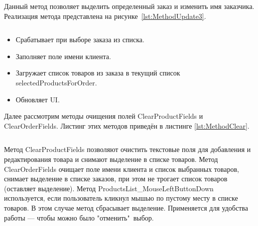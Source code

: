 \documentclass[12pt]{article}
\newcommand{\colorGIT}[1]{\textcolor{CtpLavender}{#1}}
\renewcommand{\texttt}[1]{{\small\ttfamily #1}}
\newenvironment{code}
  {\par\captionsetup{type=listing}\noindent}
  {\par\vspace{\baselineskip}}
\numberwithin{listing}{section}
\numberwithin{figure}{section}
\begin{document}
Данный метод позволяет выделить определенный заказ и изменить имя заказчика. Реализация метода представлена на рисунке~\ref{lst:MethodUpdate3}.

\begin{code}
	\inputminted[firstline=379, lastline=390]{csharp}{../3lab/StoreManager/MainWindow.xaml.cs}
	\caption{\colorGIT{\href{https://github.com/WebMasterIT/Csharp_Labs/blob/ec375afd16c0647b337cf3d8a79c8bef904fc1be/3lab/StoreManager/MainWindow.xaml.cs\#L379-L390}{Метод}} обновления нового товара }
	\label{lst:MethodUpdate3}
\end{code}

\begin{itemize}
	\item Срабатывает при выборе заказа из списка.
	\item Заполняет поле имени клиента.
	\item Загружает список товаров из заказа в текущий список \texttt{selectedProductsForOrder}.
	\item Обновляет \texttt{UI}.
\end{itemize}

{}


Далее рассмотрим методы очищения полей \texttt{ClearProductFields} и \texttt{ClearOrderFields}. Листинг этих методов приведён в листинге \ref{lst:MethodClear}.

\begin{code}
	\inputminted[firstline=392, lastline=432]{csharp}{../3lab/StoreManager/MainWindow.xaml.cs}
	\caption{\colorGIT{\href{https://github.com/WebMasterIT/Csharp_Labs/blob/ec375afd16c0647b337cf3d8a79c8bef904fc1be/3lab/StoreManager/MainWindow.xaml.cs\#L392-L432}{Методы}} очистки полей и сброса выделения товара}
	\label{lst:MethodClear}
\end{code}

Метод \texttt{ClearProductFields} позволяют очистить текстовые поля для добавления и редактирования товара и снимают выделение в списке товаров. Метод \texttt{ClearOrderFields} очищает поле имени клиента и список выбранных товаров, снимает выделение в списке заказов, при этом не трогает список товаров (оставляет выделение). Метод \texttt{ProductsList\_MouseLeftButtonDown} используется, если пользователь кликнул мышью по пустому месту в списке товаров. В этом случае метод сбрасывает выделение. Применяется для удобства работы — чтобы можно было "отменить"\ выбор.
\end{document}
